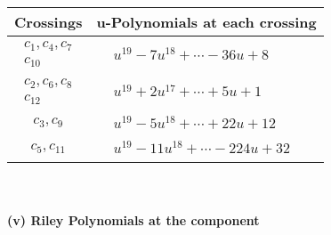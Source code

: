\documentclass[1p]{elsarticle_modified}
\theoremstyle{definition}
\begin{document}
\begin{tabular}{m{50pt}|m{274pt}}
Crossings & \hspace{64pt}u-Polynomials at each crossing \\
\hline $$\begin{aligned}c_{1},c_{4},c_{7}\\c_{10}\end{aligned}$$&$\begin{aligned}
&u^{19}-7 u^{18}+\cdots-36 u+8
\end{aligned}$\\
\hline $$\begin{aligned}c_{2},c_{6},c_{8}\\c_{12}\end{aligned}$$&$\begin{aligned}
&u^{19}+2 u^{17}+\cdots+5 u+1
\end{aligned}$\\
\hline $$\begin{aligned}c_{3},c_{9}\end{aligned}$$&$\begin{aligned}
&u^{19}-5 u^{18}+\cdots+22 u+12
\end{aligned}$\\
\hline $$\begin{aligned}c_{5},c_{11}\end{aligned}$$&$\begin{aligned}
&u^{19}-11 u^{18}+\cdots-224 u+32
\end{aligned}$\\
\hline
\end{tabular}\\~\\
\newpage\renewcommand{\arraystretch}{1}
\flushleft \textbf{(v) Riley Polynomials at the component}\newline \\
\end{document}

